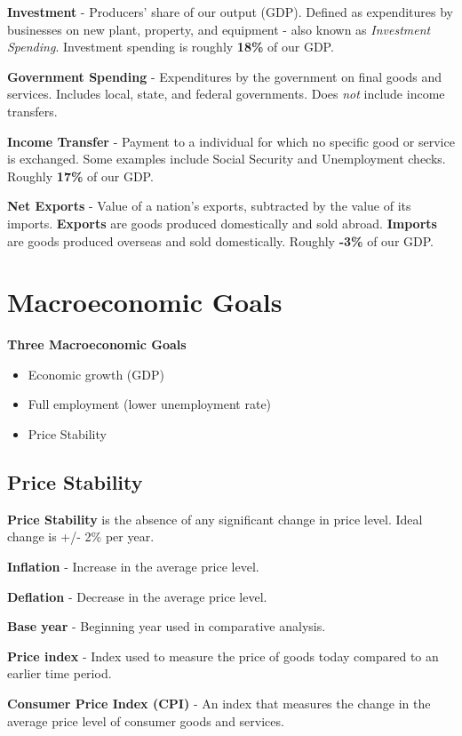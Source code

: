 \documentclass{article}
\begin{document}
\textbf{Investment} - Producers' share of our output (GDP). Defined as expenditures by businesses on new plant, property, and equipment - also known as \textit{Investment Spending}. Investment spending is roughly \textbf{18\%} of our GDP.

\textbf{Government Spending} - Expenditures by the government on final goods and services. Includes local, state, and federal governments. Does \textit{not} include income transfers.

\textbf{Income Transfer} - Payment to a individual for which no specific good or service is exchanged. Some examples include Social Security and Unemployment checks. Roughly \textbf{17\%} of our GDP.

\textbf{Net Exports} - Value of a nation's exports, subtracted by the value of its imports. \textbf{Exports} are goods produced domestically and sold abroad. \textbf{Imports} are goods produced overseas and sold domestically. Roughly \textbf{-3\%} of our GDP.

\section{Macroeconomic Goals}
\textbf{Three Macroeconomic Goals}
\begin{itemize}
    \item{Economic growth (GDP)}
    \item{Full employment (lower unemployment rate)}
    \item{Price Stability}
\end{itemize}

\subsection{Price Stability}
\textbf{Price Stability} is the absence of any significant change in price level. Ideal change is +/- 2\% per year.

\textbf{Inflation} - Increase in the average price level.

\textbf{Deflation} - Decrease in the average price level.

\textbf{Base year} - Beginning year used in comparative analysis.

\textbf{Price index} - Index used to measure the price of goods today compared to an earlier time period.

\textbf{Consumer Price Index (CPI)} - An index that measures the change in the average price level of consumer goods and services.
\end{document}
